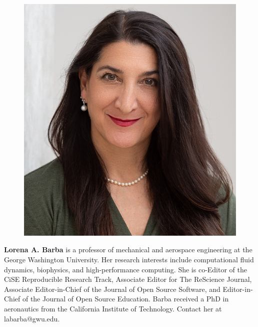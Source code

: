 \documentclass[10pt,journal,compsoc]{IEEEtran}
\begin{document}
\bigskip

\begin{figure}
\includegraphics[width=3 cm]{lorena_barba_130_2019.png}
\end{figure}
\textbf{Lorena A. Barba} is a professor of mechanical and aerospace engineering at the George Washington University. Her research interests include computational fluid dynamics, biophysics, and high-performance computing. She is co-Editor of the CiSE Reproducible Research Track, Associate Editor for The ReScience Journal, Associate Editor-in-Chief of the Journal of Open Source Software, and Editor-in-Chief of the Journal of Open Source Education. Barba received a PhD in aeronautics from the California Institute of Technology. Contact her at labarba@gwu.edu.




%
\end{document}
